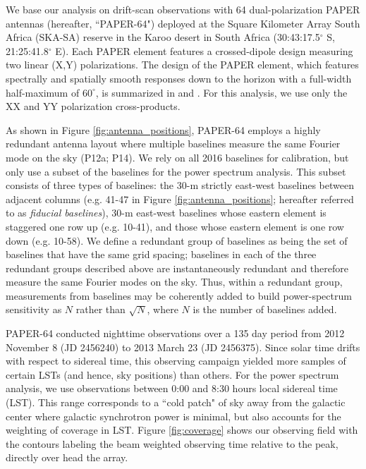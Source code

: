 \documentclass[twocolumn,numberedappendix]{emulateapj} \shorttitle{PSA64}
\begin{document}
We base our analysis on drift-scan observations 
with 64 dual-polarization PAPER antennas (hereafter, ``PAPER-64") deployed 
at the Square Kilometer Array South Africa
(SKA-SA) reserve in the Karoo desert in South Africa
(30:43:17.5$^\circ$ S, 21:25:41.8$^\circ$ E).
Each PAPER element features a crossed-dipole design measuring two
linear (X,Y) polarizations.
The design of the PAPER element, 
which features spectrally and spatially smooth responses 
down to the horizon with a full-width half-maximum of $60^{\circ}$, is summarized in \citet{parsons_et_al2010}
and \citet{pober_et_al2012}.  
For this analysis, we use only the XX and YY polarization cross-products.

As shown in Figure \ref{fig:antenna_positions}, PAPER-64 employs
a highly redundant antenna layout where multiple baselines measure
the same Fourier mode on the sky (P12a; P14).
We rely on all 2016 baselines for calibration,
but only use a subset of the baselines for the power spectrum
analysis. This subset consists of three types of baselines: the 30-m
strictly east-west baselines between adjacent columns (e.g. 41-47
in Figure \ref{fig:antenna_positions}; hereafter referred to 
as {\it fiducial baselines}), 30-m east-west baselines
whose eastern element is staggered one row up (e.g. 10-41), and
those whose eastern element is one row down (e.g. 10-58).
We define a redundant group of
baselines as being the set of baselines that have the same grid spacing;
baselines in each
of the three redundant groups described above are instantaneously redundant and
therefore measure the same Fourier modes on the sky. Thus, within a redundant group,
measurements from baselines may be 
coherently added to build power-spectrum sensitivity as $N$ rather than
$\sqrt{N}$, where $N$ is the number of baselines added.  

PAPER-64 conducted nighttime observations over a 135 day period 
from 2012 November 8 (JD 2456240) to 2013 March 23 (JD 2456375). 
Since solar time drifts with respect to sidereal time, this observing campaign
yielded more samples of certain LSTs (and hence, sky positions) than others. 
For the power spectrum analysis, we use observations between 0:00 and 8:30 hours
local sidereal time (LST).  This range corresponds to
a ``cold patch" of sky away from the galactic center where galactic synchrotron power is minimal,
but also accounts for the weighting of coverage in LST.
Figure \ref{fig:coverage} shows our observing field with the contours labeling
the beam weighted observing time relative to the peak, directly over head the
array.
\end{document}
